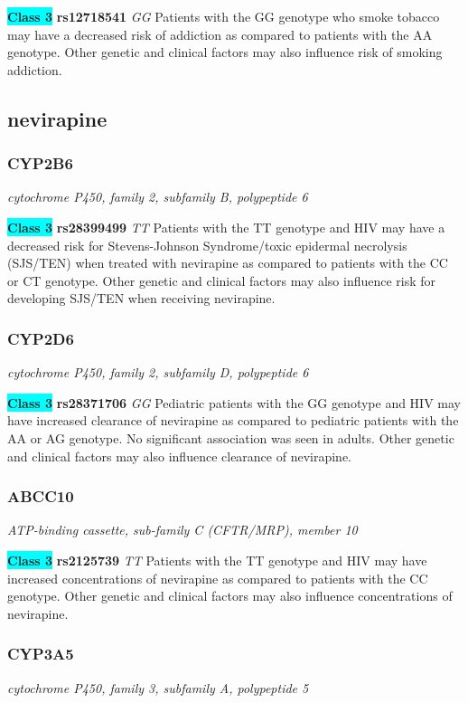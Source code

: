 \documentclass{report}
\begin{document}
\textbf{\colorbox{cyan} {Class 3}} \textbf{ rs12718541 } \textit{ GG }
Patients with the GG genotype who smoke tobacco may have a decreased risk of addiction as compared to patients with the AA genotype. Other genetic and clinical factors may also influence risk of smoking addiction.\newline\subsection{ nevirapine }\subsubsection{ CYP2B6 }
\textit{ cytochrome P450, family 2, subfamily B, polypeptide 6 }

\textbf{\colorbox{cyan} {Class 3}} \textbf{ rs28399499 } \textit{ TT }
Patients with the TT genotype and HIV may have a decreased risk for Stevens-Johnson Syndrome/toxic epidermal necrolysis (SJS/TEN) when treated with nevirapine as compared to patients with the CC or CT genotype. Other genetic and clinical factors may also influence risk for developing SJS/TEN when receiving nevirapine.\newline\subsubsection{ CYP2D6 }
\textit{ cytochrome P450, family 2, subfamily D, polypeptide 6 }

\textbf{\colorbox{cyan} {Class 3}} \textbf{ rs28371706 } \textit{ GG }
Pediatric patients with the GG genotype and HIV may have increased clearance of nevirapine as compared to pediatric patients with the AA or AG genotype. No significant association was seen in adults. Other genetic and clinical factors may also influence clearance of nevirapine.\newline\subsubsection{ ABCC10 }
\textit{ ATP-binding cassette, sub-family C (CFTR/MRP), member 10 }

\textbf{\colorbox{cyan} {Class 3}} \textbf{ rs2125739 } \textit{ TT }
Patients with the TT genotype and HIV may have increased concentrations of nevirapine as compared to patients with the CC genotype. Other genetic and clinical factors may also influence concentrations of nevirapine.\newline\subsubsection{ CYP3A5 }
\textit{ cytochrome P450, family 3, subfamily A, polypeptide 5 }
\end{document}
